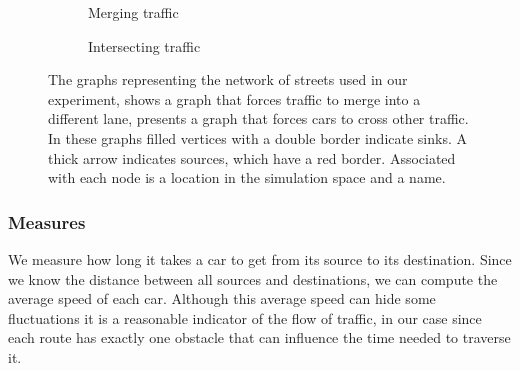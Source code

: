 \begin{figure}
	\centering
	\begin{subfigure}{0.49\textwidth}
		\centering
		
		\caption{Merging traffic}
		\label{fig:method:experiment:merging}
	\end{subfigure}
	\begin{subfigure}{0.49\textwidth}
		\centering
		
		\caption{Intersecting traffic}
		\label{fig:method:experiment:intersection}
	\end{subfigure}	
	\caption{The graphs representing the network of streets used in our experiment,  shows a graph that forces traffic to merge into a different lane,  presents a graph that forces cars to cross other traffic. In these graphs filled vertices with a double border indicate sinks. A thick arrow indicates sources, which have a red border. Associated with each node is a location in the simulation space and a name.}
	\label{fig:method:experimentGraphs}
\end{figure}

\subsubsection{Measures}
\label{ss:method:experiment:measures}
We measure how long it takes a car to get from its source to its destination. Since we know the distance between all sources and destinations, we can compute the average speed of each car. Although this average speed can hide some fluctuations it is a reasonable indicator of the flow of traffic, in our case since each route has exactly one obstacle that can influence the time needed to traverse it. 